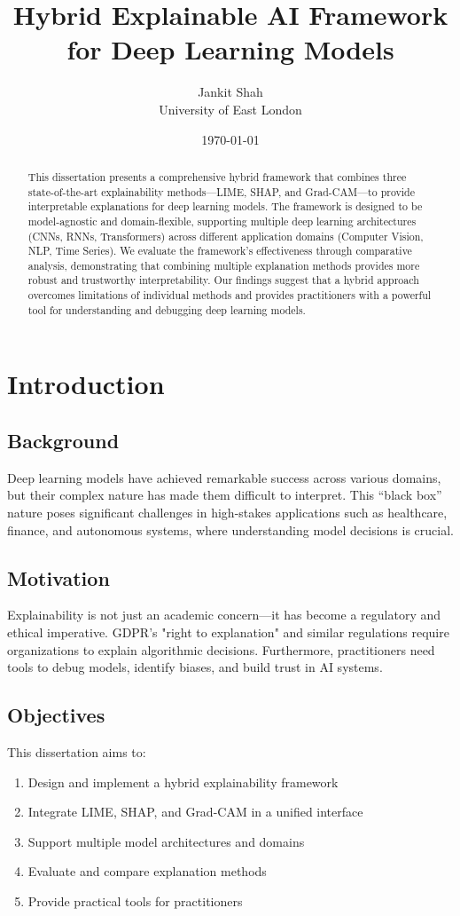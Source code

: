 \documentclass[12pt,a4paper]{report}
\title{Hybrid Explainable AI Framework for Deep Learning Models}
\author{Jankit Shah \\ University of East London}
\date{\today}
\begin{document}
\maketitle

\begin{abstract}
This dissertation presents a comprehensive hybrid framework that combines three state-of-the-art explainability methods—LIME, SHAP, and Grad-CAM—to provide interpretable explanations for deep learning models. The framework is designed to be model-agnostic and domain-flexible, supporting multiple deep learning architectures (CNNs, RNNs, Transformers) across different application domains (Computer Vision, NLP, Time Series). We evaluate the framework's effectiveness through comparative analysis, demonstrating that combining multiple explanation methods provides more robust and trustworthy interpretability. Our findings suggest that a hybrid approach overcomes limitations of individual methods and provides practitioners with a powerful tool for understanding and debugging deep learning models.
\end{abstract}

\tableofcontents

\chapter{Introduction}

\section{Background}
Deep learning models have achieved remarkable success across various domains, but their complex nature has made them difficult to interpret. This ``black box'' nature poses significant challenges in high-stakes applications such as healthcare, finance, and autonomous systems, where understanding model decisions is crucial.

\section{Motivation}
Explainability is not just an academic concern—it has become a regulatory and ethical imperative. GDPR's "right to explanation" and similar regulations require organizations to explain algorithmic decisions. Furthermore, practitioners need tools to debug models, identify biases, and build trust in AI systems.

\section{Objectives}
This dissertation aims to:
\begin{enumerate}
    \item Design and implement a hybrid explainability framework
    \item Integrate LIME, SHAP, and Grad-CAM in a unified interface
    \item Support multiple model architectures and domains
    \item Evaluate and compare explanation methods
    \item Provide practical tools for practitioners
\end{enumerate}
\end{document}

